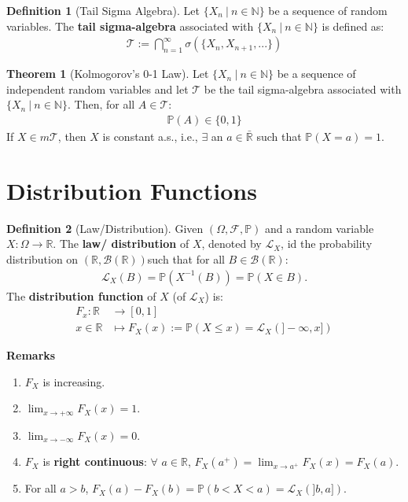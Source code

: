 \documentclass[11pt]{article}
\theoremstyle{definition}
\newtheorem{defn}{Definition}[section]
\theoremstyle{theorem}
\newtheorem{thm}{Theorem}[section]
\newcommand{\R}[0]{\mathbb{R}}
\newcommand{\N}[0]{\mathbb{N}}
\newcommand{\prob}[1]{\mathbb{P}\left(#1 \right)}
\begin{document}
\begin{defn}[Tail Sigma Algebra]
	Let \( \{ X_n\ |\ n \in \N \} \) be a sequence of random variables. The \textbf{tail sigma-algebra} associated with \( \{ X_n\ |\ n \in \N \} \) is defined as:
	\begin{align}
		\mathcal{T} := \bigcap_{n=1}^\infty \sigma (\{X_n, X_{n+1}, ...  \} )
	\end{align}
\end{defn}

\begin{thm}[Kolmogorov's 0-1 Law]
	Let \( \{ X_n\ |\ n \in \N \} \) be a sequence of independent random variables and let \( \mathcal{T} \) be the tail sigma-algebra associated with \( \{ X_n\ |\ n \in \N \} \). Then, for all \( A \in \mathcal{T} \):
	\begin{align}
		\prob{A} \in \{ 0, 1 \} 
	\end{align}
	If \( X \in m \mathcal{T} \), then \( X \) is constant a.s., i.e., \( \exists \) an \( a \in \bar{\R} \) such that \( \prob{X = a} = 1 \). 
\end{thm}


\section{Distribution Functions}
\begin{defn}[Law/Distribution]
	Given \( (\Omega, \mathcal{F}, \mathbb{P}) \) and a random variable \( X: \Omega \rightarrow \R \). The \textbf{law/ distribution} of \( X \), denoted by \( \mathcal{L}_X \), id the probability distribution on \( (\R, \mathcal{B}(\R)) \)such that for all \( B \in \mathcal{B}( \R) \): 
	\begin{align}
		\mathcal{L}_X(B) = \prob{X^{-1}(B)} = \prob{X \in B }. 
	\end{align}
	The \textbf{distribution function} of \( X \) (of \( \mathcal{L}_X \)) is: 
	\begin{align*} 
		F_x: \R & \rightarrow [0, 1] \\
		x \in \R & \mapsto F_X(x) := \prob{X \leq x} = \mathcal{L}_X(]-\infty, x])
	\end{align*}
\end{defn}
\textbf{Remarks}
\begin{enumerate}[noitemsep]
	\item \( F_X \) is increasing.
	\item \( \lim_{x \rightarrow + \infty} F_X(x) = 1 \).
	\item \( \lim_{x \rightarrow -\infty} F_X(x) = 0 \). 
	\item \( F_X \) is \textbf{right continuous}: \( \forall \) \( a \in \R \), \( F_X(a^+) = \lim_{x \rightarrow a^+} F_X(x) = F_X(a) \). 
	\item For all \( a > b \), \( F_X(a) - F_X(b) = \prob{b < X < a } = \mathcal{L}_X(]b, a]) \). 
\end{enumerate}
\end{document}
